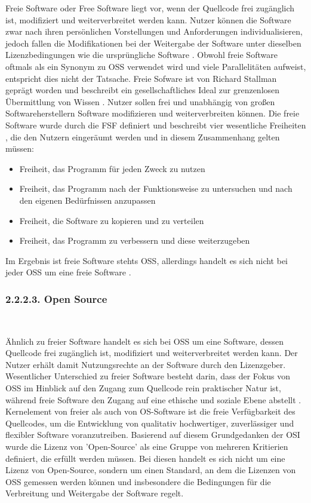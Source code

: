 Freie Software oder Free Software liegt vor, wenn der Quellcode frei zugänglich ist, modifiziert und weiterverbreitet werden kann. Nutzer können die Software zwar nach ihren persönlichen Vorstellungen und Anforderungen individualisieren, jedoch fallen die Modifikationen bei der Weitergabe der Software unter dieselben Lizenzbedingungen wie die ursprüngliche Software \cite{fsf_freie_3021}. Obwohl freie Software oftmals als ein Synonym zu OSS verwendet wird und viele Parallelitäten aufweist, entspricht dies nicht der Tatsache. Freie Sofware ist von Richard Stallman geprägt worden und beschreibt ein gesellschaftliches Ideal zur grenzenlosen Übermittlung von Wissen \cite[S. 5]{wichmann_linux-_2005}. Nutzer sollen frei und unabhängig von großen Softwareherstellern Software modifizieren und weiterverbreiten können. Die freie Software wurde durch die FSF definiert und beschreibt vier wesentliche Freiheiten \cite{fsf_freie_3021}, die den Nutzern eingeräumt werden und in diesem Zusammenhang gelten müssen: 

\begin{itemize}
    \item Freiheit, das Programm für jeden Zweck zu nutzen
    \item Freiheit, das Programm nach der Funktionsweise zu untersuchen und nach den eigenen Bedürfnissen anzupassen
    \item Freiheit, die Software zu kopieren und zu verteilen
    \item Freiheit, das Programm zu verbessern und diese weiterzugeben
\end{itemize}

Im Ergebnis ist freie Software stehts OSS, allerdings handelt es sich nicht bei jeder OSS um eine freie Software \cite[S. 28]{kees_open_2015}.

\subsubsection{2.2.2.3. Open Source}$~$

Ähnlich zu freier Software handelt es sich bei OSS um eine Software, dessen Quellcode frei zugänglich ist, modifiziert und weiterverbreitet werden kann. Der Nutzer erhält damit Nutzungsrechte an der Software durch den Lizenzgeber. Wesentlicher Unterschied zu freier Software besteht darin, dass der Fokus von OSS im Hinblick auf den Zugang zum Quellcode rein praktischer Natur ist, während freie Software den Zugang auf eine ethische und soziale Ebene abstellt \cite[S. 28]{kees_open_2015}. Kernelement von freier als auch von OS-Software ist die freie Verfügbarkeit des Quellcodes, um die Entwicklung von qualitativ hochwertiger, zuverlässiger und flexibler Software voranzutreiben. Basierend auf diesem Grundgedanken der OSI wurde die Lizenz von 'Open-Source' als eine Gruppe von mehreren Kritierien \cite{open_source_inititative_open_2018} definiert, die erfüllt werden müssen. Bei diesen handelt es sich nicht um eine Lizenz von Open-Source, sondern um einen Standard, an dem die Lizenzen von OSS gemessen werden können und insbesondere die Bedingungen für die Verbreitung und Weitergabe der Software regelt. 

